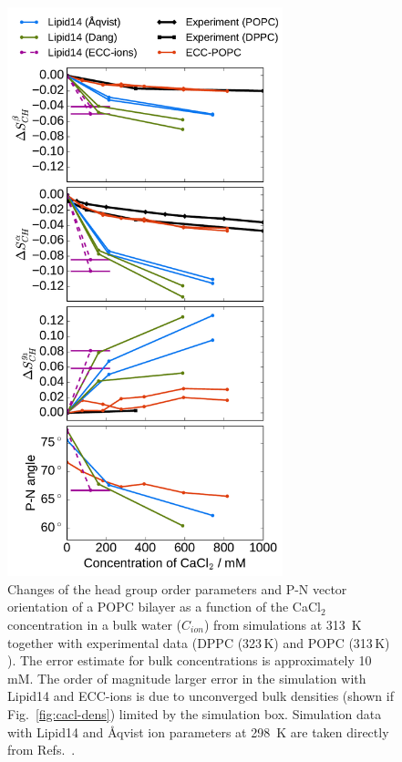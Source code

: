 \documentclass[aip,jcp,twocolumn]{revtex4}
\begin{document}
\begin{figure}[htb!]
  \centering
  \includegraphics[width=8.0cm]{../Fig/ipython_nb/PN_angle_OrdPars-A-B-g3_L14-ECCL17_q80_sig89_CaCl.pdf}
  \caption{\label{fig:delta_ordPar_CaCl}
    Changes of the head group order parameters and P-N vector orientation of a POPC bilayer 
    as a function of the CaCl$_2$ concentration in a bulk water ($C_{ion}$)
    from simulations at 313~K together with experimental data 
    (DPPC (323\,K) \cite{akutsu81} and POPC (313\,K) \cite{altenbach84}). 
    The error estimate for bulk concentrations is approximately 10\,mM.
    The order of magnitude larger error in the
    simulation with Lipid14 and ECC-ions is due to unconverged bulk densities  
    (shown if Fig.~\ref{fig:cacl-dens}) limited by the simulation box. 
    Simulation data with Lipid14 and \AA{}qvist ion parameters at 298~K are taken directly from
    Refs.~.
  }
\end{figure}
\end{document}
